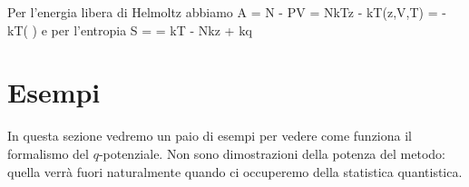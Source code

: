 Per l'energia libera di Helmoltz abbiamo
\be
A = \mu N - PV = NkT\ln z - kT\ln\calQ(z,V,T) = -kT\ln\left(  \right)
\ee
e per l'entropia
\be
S =  = kT - Nk\ln z + kq
\ee


\section{Esempi}

In questa sezione vedremo un paio di esempi per vedere come funziona il formalismo del $q$-potenziale. Non sono dimostrazioni della potenza del metodo: quella verrà fuori naturalmente quando ci occuperemo della statistica quantistica.

